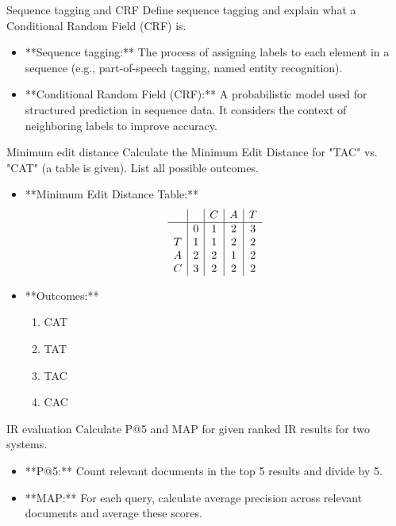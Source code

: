 \documentclass{article}
\begin{document}
\begin{exercise}{Sequence tagging and CRF}
  Define sequence tagging and explain what a Conditional Random Field (CRF) is.

  \begin{solution}
    \begin{itemize}
        \item **Sequence tagging:** The process of assigning labels to each element in a sequence (e.g., part-of-speech tagging, named entity recognition).
        \item **Conditional Random Field (CRF):** A probabilistic model used for structured prediction in sequence data. It considers the context of neighboring labels to improve accuracy.
    \end{itemize}
  \end{solution}
\end{exercise}

\begin{exercise}{Minimum edit distance}
  Calculate the Minimum Edit Distance for "TAC" vs. "CAT" (a table is given). List all possible outcomes.

  \begin{solution}
    \begin{itemize}
        \item **Minimum Edit Distance Table:**
        \[
        \begin{array}{c|c|c|c|c}
            &  & C & A & T \\
            \hline
            & 0 & 1 & 2 & 3 \\
            T & 1 & 1 & 2 & 2 \\
            A & 2 & 2 & 1 & 2 \\
            C & 3 & 2 & 2 & 2 \\
        \end{array}
        \]
        \item **Outcomes:**
        \begin{enumerate}
            \item CAT
            \item TAT
            \item TAC
            \item CAC
        \end{enumerate}
    \end{itemize}
  \end{solution}
\end{exercise}

\begin{exercise}{IR evaluation}
  Calculate P@5 and MAP for given ranked IR results for two systems.

  \begin{solution}
    \begin{itemize}
        \item **P@5:** Count relevant documents in the top 5 results and divide by 5.
        \item **MAP:** For each query, calculate average precision across relevant documents and average these scores.
    \end{itemize}
  \end{solution}
\end{exercise}
\end{document}
